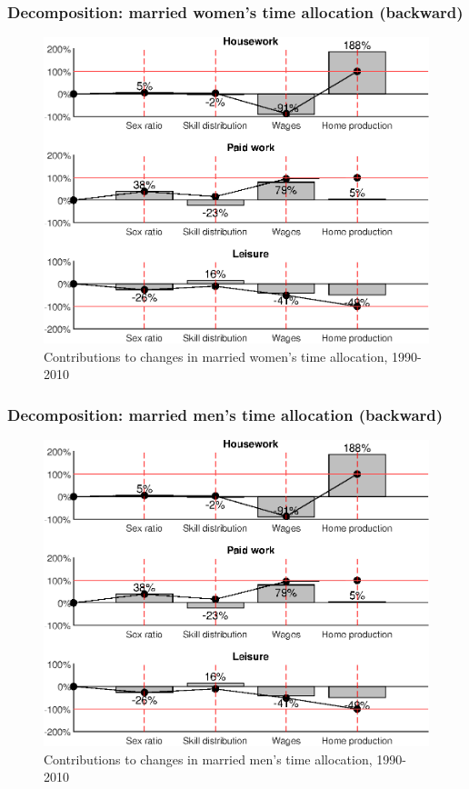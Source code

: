 \documentclass{beamer}
\begin{document}
\begin{frame}[noframenumbering]
	\frametitle{Decomposition: married women's time allocation (backward)}\label{slide:decomp_female_ta_back}
	\begin{figure}
		\centering
		\caption{Contributions to changes in married women's time allocation, 1990-2010}
		\includegraphics[width=.6\textwidth]{back_decomp_ta_f}
	\end{figure}
	\hyperlink{slide:decomp_female_ta}{}
\end{frame}

\begin{frame}[noframenumbering]
	\frametitle{Decomposition: married men's time allocation (backward)}\label{slide:decomp_male_ta_back}
	\begin{figure}
		\centering
		\caption{Contributions to changes in married men's time allocation, 1990-2010}
		\includegraphics[width=.6\textwidth]{back_decomp_ta_f}
	\end{figure}
	\hyperlink{slide:decomp_male_ta}{}
\end{frame}
\end{document}
